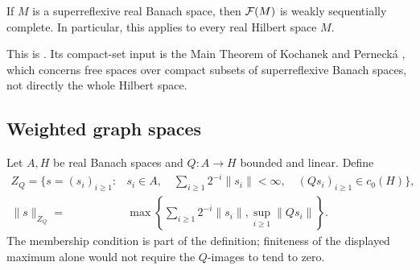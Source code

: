 \begin{theorem}
\label{thm:free-wsc}
If \(M\) is a superreflexive real Banach space, then \(\mathcal F(M)\) is
weakly sequentially complete. In particular, this applies to every
real Hilbert space \(M\).
\end{theorem}

This is \cite[Corollary~2.5, arXiv version cited in the
bibliography]{ANPP21}. Its compact-set input is the Main Theorem of
Kochanek and Perneck\'a \cite{KP18}, which concerns free spaces over
compact subsets of superreflexive Banach spaces, not directly the
whole Hilbert space.

\subsection{Weighted graph spaces}

Let \(A,H\) be real Banach spaces and \(Q:A\to H\) bounded
and linear. Define
\begin{align}
\label{eq:graph-space}
 Z_Q=\bigl\{s=(s_i)_{i\ge1}:{}&
 s_i\in A,\quad \sum_{i\ge1}2^{-i}\|s_i\|<\infty,\quad
 (Qs_i)_{i\ge1}\in c_0(H)\bigr\},\\
\label{eq:graph-norm}
 \|s\|_{Z_Q}
 ={}&\max\left\{\sum_{i\ge1}2^{-i}\|s_i\|,
                         \sup_{i\ge1}\|Qs_i\|\right\}.
\end{align}
The membership condition is part of the definition; finiteness of the
displayed maximum alone would not require the \(Q\)-images to tend to
zero.



